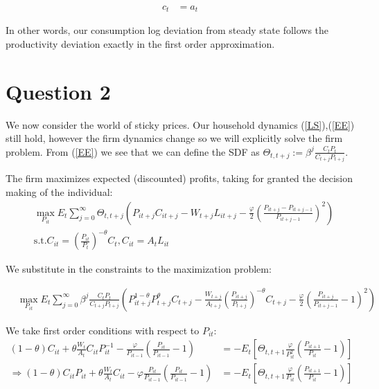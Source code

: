 \documentclass[11pt]{article} %
\begin{document}
\begin{align}
c_t &= a_t
\end{align}

In other words, our consumption log deviation from steady state follows the productivity deviation exactly in the first order approximation.

\section{Question 2}
We now consider the world of sticky prices. Our household dynamics (\ref{LS}),(\ref{EE}) still hold, however the firm dynamics change so we will explicitly solve the firm problem. From (\ref{EE}) we see that we can define the SDF as $\Theta_{t,t+j} := \beta^j \frac{C_tP_t}{C_{t+j}P_{t+j}}$.

The firm maximizes expected (discounted) profits, taking for granted the decision making of the individual:
\begin{align*}
&\max_{P_{it}} E_t\sum_{j=0}^{\infty} \Theta_{t,t+j}\left( P_{it+j} C_{it+j} - W_{t+j}L_{it+j} - \frac{\varphi}{2} \left( \frac{P_{it+j} - P_{it+j-1}}{P_{it+j-1}} \right)^2 \right)\\
&\text{s.t.} C_{it} = \left( \frac{P_{it}}{P_t} \right)^{-\theta}C_t, C_{it} = A_tL_{it}
\end{align*}

We substitute in the constraints to the maximization problem:

\begin{align*}
&\max_{P_{it}} E_t\sum_{j=0}^{\infty}  \beta^j \frac{C_tP_t}{C_{t+j}P_{t+j}}\left( P_{it+j}^{1-\theta}  P_{t+j}^{\theta}C_{t+j} - \frac{W_{t+j}}{A_{t+j}} \left( \frac{P_{it+j}}{P_{t+j}} \right)^{-\theta}C_{t+j} - \frac{\varphi}{2} \left( \frac{P_{it+j}}{P_{it+j-1}} - 1 \right)^2 \right)
\end{align*}


We take first order conditions with respect to $P_{it}$:
\begin{align*}
(1-\theta)C_{it} + \theta\frac{W_t}{A_t}C_{it}P_{it}^{-1} - \frac{\varphi}{P_{it-1}}\left(\frac{P_{it}}{P_{it-1}} - 1 \right) &=-E_t\left[\Theta_{t,t+1}\frac{\varphi}{P_{it}^2}\left( \frac{P_{it+1}}{P_{it}} - 1 \right) \right]\\
\Rightarrow  (1-\theta)C_{it}P_{it} + \theta\frac{W_t}{A_t}C_{it} - \varphi \frac{P_{it}}{P_{it-1}}\left(\frac{P_{it}}{P_{it-1}} - 1 \right) &=-E_t\left[\Theta_{t,t+1}\frac{\varphi}{P_{it}}\left( \frac{P_{it+1}}{P_{it}} - 1 \right) \right]
\end{align*}
\end{document}
